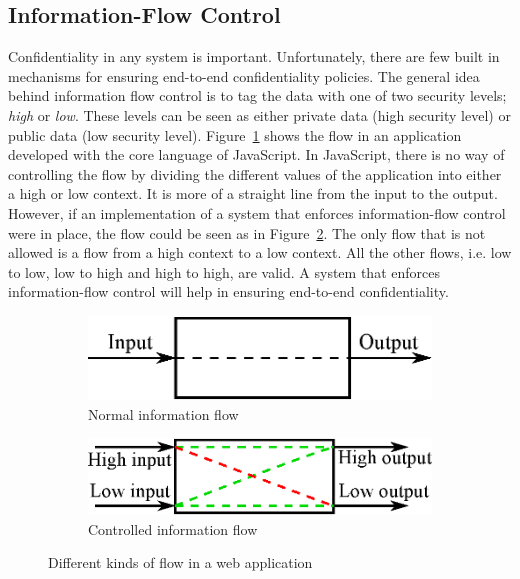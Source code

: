 \subsection{Information-Flow Control}
Confidentiality in any system is important. Unfortunately, there are few built in mechanisms for ensuring end-to-end confidentiality policies.\cite{ifc-jsac} The general idea behind information flow control is to tag the data with one of two security levels; \emph{high} or \emph{low}. These levels can be seen as either private data (high security level) or public data (low security level). Figure~\ref{fig:normal_flow} shows the flow in an application developed with the core language of JavaScript. In JavaScript, there is no way of controlling the flow by dividing the different values of the application into either a high or low context. It is more of a straight line from the input to the output. However, if an implementation of a system that enforces information-flow control were in place, the flow could be seen as in Figure~\ref{fig:controlled_flow}. The only flow that is not allowed is a flow from a high context to a low context. All the other flows, i.e. low to low, low to high and high to high, are valid. A system that enforces information-flow control will help in ensuring end-to-end confidentiality.
\begin{figure}[h]
  \begin{subfigure}{.5\textwidth}
    \includegraphics[scale=0.65]{images/flow_normal.eps}
    \caption{Normal information flow}
    \label{fig:normal_flow}
  \end{subfigure}
  \begin{subfigure}{.5\textwidth}
    \includegraphics[scale=0.65]{images/flow_controlled.eps}
    \caption{Controlled information flow}
    \label{fig:controlled_flow}
  \end{subfigure}
  \caption{Different kinds of flow in a web application}
  \label{fig:flows}
\end{figure}
